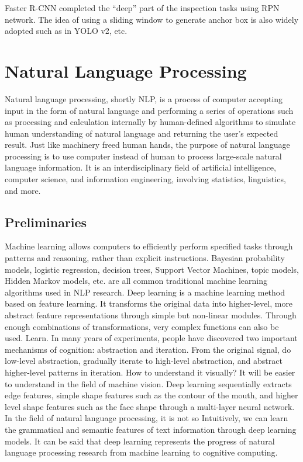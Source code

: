 Faster R-CNN completed the ``deep'' part of the inspection tasks using RPN network. The idea of using a sliding window to generate anchor box is also widely adopted such as in YOLO v2, etc. 

\section{Natural Language Processing}
Natural language processing, shortly NLP, is a process of computer accepting input in the form of natural language and performing a series of operations such as processing and calculation internally by human-defined algorithms to simulate human understanding of natural language and returning the user's expected result. Just like machinery freed human hands, the purpose of natural language processing is to use computer instead of human to process large-scale natural language information. It is an interdisciplinary field of artificial intelligence, computer science, and information engineering, involving statistics, linguistics, and more.

\subsection{Preliminaries}
Machine learning allows computers to efficiently perform specified tasks through patterns and reasoning, rather than explicit instructions. Bayesian probability models, logistic regression, decision trees, Support Vector Machines, topic models, Hidden Markov models, etc. are all common traditional machine learning algorithms used in NLP research. Deep learning is a machine learning method based on feature learning. It transforms the original data into higher-level, more abstract feature representations through simple but non-linear modules. Through enough combinations of transformations, very complex functions can also be used. Learn. In many years of experiments, people have discovered two important mechanisms of cognition: abstraction and iteration. From the original signal, do low-level abstraction, gradually iterate to high-level abstraction, and abstract higher-level patterns in iteration. How to understand it visually? It will be easier to understand in the field of machine vision. Deep learning sequentially extracts edge features, simple shape features such as the contour of the mouth, and higher level shape features such as the face shape through a multi-layer neural network. In the field of natural language processing, it is not so Intuitively, we can learn the grammatical and semantic features of text information through deep learning models. It can be said that deep learning represents the progress of natural language processing research from machine learning to cognitive computing.
